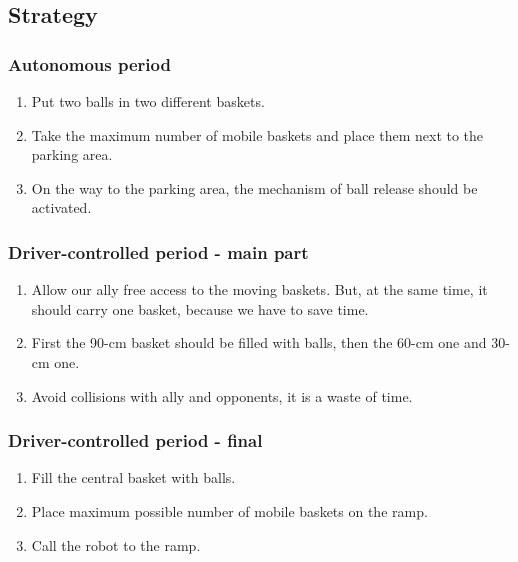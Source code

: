 \subsection{Strategy} 
\subsubsection{Autonomous period}
\begin{enumerate}
    \item Put two balls in two different baskets.
	\item Take the maximum number of mobile baskets and place them next to the parking area.
	\item On the way to the parking area, the mechanism of ball release should be activated.
	         
\end{enumerate}
\subsubsection{Driver-controlled period - main part}
\begin{enumerate}
	\item Allow our ally free access to the moving baskets. But, at the same time, it should carry one basket, because we have to save time.
	\item First the 90-cm basket should be filled with balls, then the 60-cm one and 30-cm one.
	\item Avoid collisions with ally and opponents, it is a waste of time.
\end{enumerate}
\subsubsection{Driver-controlled period - final}
\begin{enumerate}
	\item Fill the central basket with balls.
	\item Place maximum possible number of mobile baskets on the ramp.
	\item Call the robot to the ramp. 
\end{enumerate}
\fillpage


